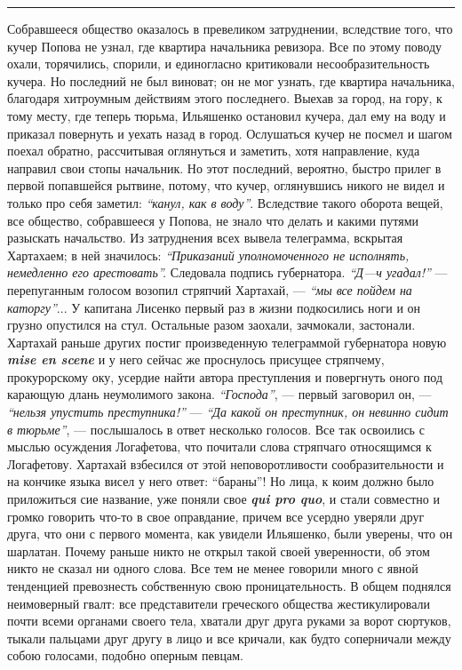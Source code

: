 \documentclass[a4paper,20pt]{report}
\begin{document}
\par\noindent\rule{\textwidth}{0.4pt}

Собравшееся общество оказалось в превеликом затруднении, вследствие того, 
что кучер Попова не узнал, где квартира начальника ревизора. Все по этому поводу охали,
торячились, спорили, и единогласно критиковали несообразительность кучера. 
Но последний не был виноват; он не мог
узнать, где квартира начальника, благодаря хитроумным действиям этого последнего. Выехав за город, на
гору, к тому месту, где теперь тюрьма, Ильяшенко остановил кучера, 
дал ему на воду и приказал повернуть
и уехать назад в город. Ослушаться кучер не посмел
и шагом поехал обратно, рассчитывая оглянуться и заметить,
хотя направление, куда направил свои стопы начальник. 
Но этот последний, вероятно, быстро прилег в
первой попавшейся рытвине, потому, что кучер, оглянувшись
никого не видел и только про себя заметил:
\emph{``канул, как в воду''}. Вследствие такого оборота вещей, все общество, 
собравшееся у Попова, не знало что делать и какими
путями разыскать начальство. Из затруднения всех вывела телеграмма, вскрытая Хартахаем;
в ней значилось: 
\emph{``Приказаний уполномоченного не исполнять, немедленно его арестовать''.}
Следовала подпись губернатора. \emph{``Д—ч угадал!''} —
перепуганным голосом возопил стряпчий Хартахай, — \emph{``мы
все пойдем на каторгу''}... У капитана Лисенко первый
раз в жизни подкосились ноги и он грузно опустился
на стул. Остальные разом заохали, зачмокали, застонали.
Хартахай раньше других постиг произведенную телеграммой губернатора новую \textbf{\em mise en scene} 
и у него сейчас же проснулось присущее стряпчему, прокурорскому оку,
усердие найти автора преступления и повергнуть оного под
карающую длань неумолимого закона. \emph{``Господа''}, — первый
заговорил он, — \emph{``нельзя упустить преступника!''} — \emph{``Да какой он преступник, он невинно сидит в тюрьме''}, —
послышалось в ответ несколько голосов. Все так освоились с мыслью осуждения Логафетова, что почитали слова
стряпчаго относящимся к Логафетову. Хартахай взбесился от этой
неповоротливости сообразительности и на кончике языка висел у него ответ:
``бараны''! Но лица, к коим должно было приложиться сие название, уже поняли
свое \textbf{\em qui pro quo}, и стали совместно и громко говорить что-то в
свое оправдание, причем все усердно уверяли друг друга, что они с первого
момента, как увидели Ильяшенко, были уверены, что он шарлатан.  Почему раньше
никто не открыл такой своей уверенности, об этом никто не сказал ни одного
слова.  Все тем не менее говорили много с явной тенденцией превознесть
собственную свою проницательность.  В общем поднялся неимоверный гвалт: все
представители греческого общества жестикулировали почти всеми органами своего
тела, хватали друг друга руками за ворот сюртуков, тыкали пальцами друг другу в
лицо и все кричали, как будто соперничали между собою голосами, подобно оперным
певцам.
\end{document}
